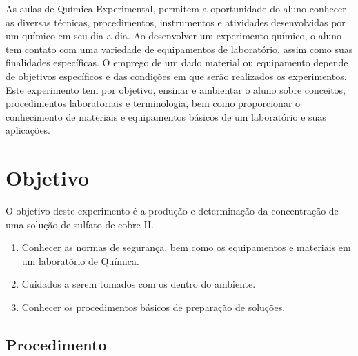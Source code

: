 \documentclass[a4paper, 11pt]{article}
\begin{document}
\indent As aulas de Química Experimental, permitem a oportunidade do aluno conhecer as diversas técnicas, procedimentos, instrumentos e atividades desenvolvidas por um químico em seu dia-a-dia.
Ao desenvolver um experimento químico, o aluno tem contato com uma variedade de equipamentos de laboratório, assim como suas finalidades específicas.
O emprego de um dado material ou equipamento depende de objetivos específicos e das condições em que serão realizados os experimentos.\\
\indent Este experimento tem por objetivo, ensinar e ambientar o aluno sobre conceitos, procedimentos laboratoriais e terminologia, bem como proporcionar o conhecimento de materiais e equipamentos básicos de um laboratório e suas aplicações.

\section{Objetivo}\label{sec:objetivo}
\indent O objetivo deste experimento é a produção e determinação da concentração de uma solução de sulfato de cobre II\@.
\begin{enumerate}

\item Conhecer as normas de segurança, bem como os equipamentos e materiais em um laboratório de Química.
\item Cuidados a serem tomados com os dentro do ambiente.
\item Conhecer os procedimentos básicos de preparação de soluções.

\end{enumerate}

\subsection*{Procedimento}
\end{document}
